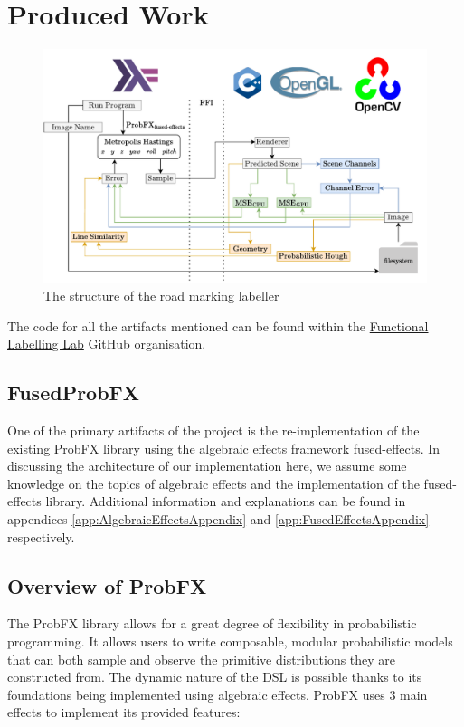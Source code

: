 \documentclass[conference]{IEEEtran}
\begin{document}
\section{Produced Work}
\begin{figure}[h]
    \centering
    \includegraphics[width=.9\linewidth]{images/FFI Diagram.drawio.pdf}
    \caption{The structure of the road marking labeller}
    \label{fig:ffidiagram}
\end{figure}

The code for all the artifacts mentioned can be found within the \href{https://github.com/Functional-Labelling-Lab}{Functional Labelling Lab} GitHub organisation.

\subsection*{\textbf{FusedProbFX}}
One of the primary artifacts of the project is the re-implementation of the existing ProbFX library using the algebraic effects framework fused-effects. In discussing the architecture of our implementation here, we assume some knowledge on the topics of algebraic effects and the implementation of the fused-effects library. Additional information and explanations can be found in appendices \ref{app:AlgebraicEffectsAppendix} and \ref{app:FusedEffectsAppendix} respectively.

\subsection*{Overview of ProbFX}
The ProbFX library allows for a great degree of flexibility in probabilistic programming. It allows users to write composable, modular probabilistic models that can both sample and observe the primitive distributions they are constructed from. The dynamic nature of the DSL is possible thanks to its foundations being implemented using algebraic effects. ProbFX uses 3 main effects to implement its provided features:
\end{document}
